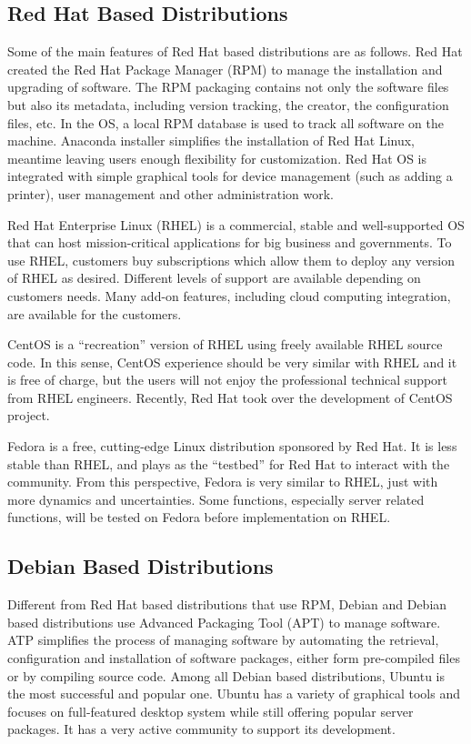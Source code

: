 \subsection{Red Hat Based Distributions}

Some of the main features of Red Hat based distributions are as follows. Red Hat created the Red Hat Package Manager (RPM) to manage the installation and upgrading of software. The RPM packaging contains not only the software files but also its metadata, including version tracking, the creator, the configuration files, etc. In the OS, a local RPM database is used to track all software on the machine. Anaconda installer simplifies the installation of Red Hat Linux, meantime leaving users enough flexibility for customization. Red Hat OS is integrated with simple graphical tools for device management (such as adding a printer), user management and other administration work.

Red Hat Enterprise Linux (RHEL) is a commercial, stable and well-supported OS that can host mission-critical applications for big business and governments. To use RHEL, customers buy subscriptions which allow them to deploy any version of RHEL as desired. Different levels of support are available depending on customers needs. Many add-on features, including cloud computing integration, are available for the customers.

CentOS is a ``recreation'' version of RHEL using freely available RHEL source code. In this sense, CentOS experience should be very similar with RHEL and it is free of charge, but the users will not enjoy the professional technical support from RHEL engineers.
Recently, Red Hat took over the development of CentOS project.

Fedora is a free, cutting-edge Linux distribution sponsored by Red Hat. It is less stable than RHEL, and plays as the ``testbed'' for Red Hat to interact with the community. From this perspective, Fedora is very similar to RHEL, just with more dynamics and uncertainties. Some functions, especially server related functions, will be tested on Fedora before implementation on RHEL.

\subsection{Debian Based Distributions}

Different from Red Hat based distributions that use RPM, Debian and Debian based distributions use Advanced Packaging Tool (APT) to manage software. ATP simplifies the process of managing software by automating the retrieval, configuration and installation of  software packages, either form pre-compiled files or by compiling source code. Among all Debian based distributions, Ubuntu is the most successful and popular one. Ubuntu has a variety of graphical tools and focuses on full-featured desktop system while still offering popular server packages. It has a very active community to support its development.

